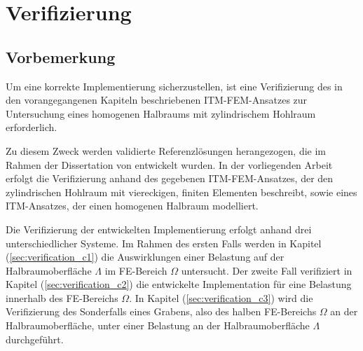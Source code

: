 \chapter{Verifizierung}
\label{cha:Verifizierung}

\section{Vorbemerkung}
\label{sec:Vorbem_Verifizierung}
Um eine korrekte Implementierung sicherzustellen, ist eine Verifizierung des in den vorangegangenen Kapiteln beschriebenen ITM-FEM-Ansatzes zur Untersuchung eines homogenen Halbraums mit zylindrischem Hohlraum erforderlich.

Zu diesem Zweck werden validierte Referenzlösungen herangezogen, die im Rahmen der Dissertation von \cite{Freisinger2022} entwickelt wurden. In der vorliegenden Arbeit erfolgt die Verifizierung anhand des gegebenen ITM-FEM-Ansatzes, der den zylindrischen Hohlraum mit viereckigen, finiten Elementen beschreibt, sowie eines ITM-Ansatzes, der einen homogenen Halbraum modelliert.

Die Verifizierung der entwickelten Implementierung erfolgt anhand drei unterschiedlicher Systeme. %
Im Rahmen des ersten Falls werden in Kapitel (\ref{sec:verification_c1}) die Auswirklungen einer Belastung auf der Halbraumoberfläche $\Lambda$ im FE-Bereich $\Omega$ untersucht.
Der zweite Fall verifiziert in Kapitel (\ref{sec:verification_c2}) die entwickelte Implementation für eine Belastung innerhalb des FE-Bereichs $\Omega$.
In Kapitel (\ref{sec:verification_c3}) wird die Verifizierung des Sonderfalls eines Grabens, also des halben FE-Bereichs $\Omega$ an der Halbraumoberfläche, unter einer Belastung an der Halbraumoberfläche $\Lambda$ durchgeführt.


